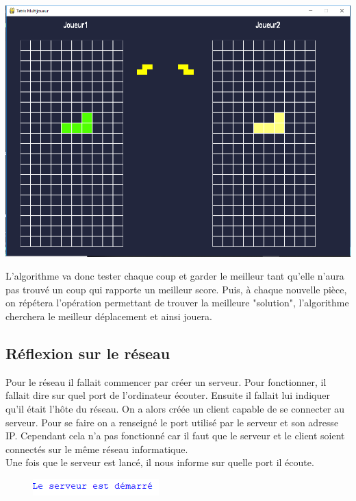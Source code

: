 \documentclass[a4paper, 11pt]{article}
\begin{document}
                \includegraphics[scale=0.6]{images/grille.png}
                
                L'algorithme va donc tester chaque coup et garder le meilleur tant qu'elle n'aura pas trouvé un coup qui rapporte un meilleur score.\newline
                Puis, à chaque nouvelle pièce, on répétera l'opération permettant de trouver la meilleure "solution", l'algorithme cherchera le meilleur déplacement et ainsi jouera.
        \subsection{Réflexion sur le réseau}
            Pour le réseau il fallait commencer par créer un serveur. Pour fonctionner, il fallait dire sur quel port de l'ordinateur écouter. Ensuite il fallait lui indiquer qu'il était l’hôte du réseau. On a alors créée un client capable de se connecter au serveur. Pour se faire on a renseigné le port utilisé par le serveur et son adresse IP. Cependant cela n'a pas fonctionné car il faut que le serveur et le client soient connectés sur le même réseau informatique.\\ Une fois que le serveur est lancé, il nous informe sur quelle port il écoute.

            \begin{figure}[ht]
                \centering
                \includegraphics[]{images/serveur.png}
            \end{figure}
            
\end{document}
